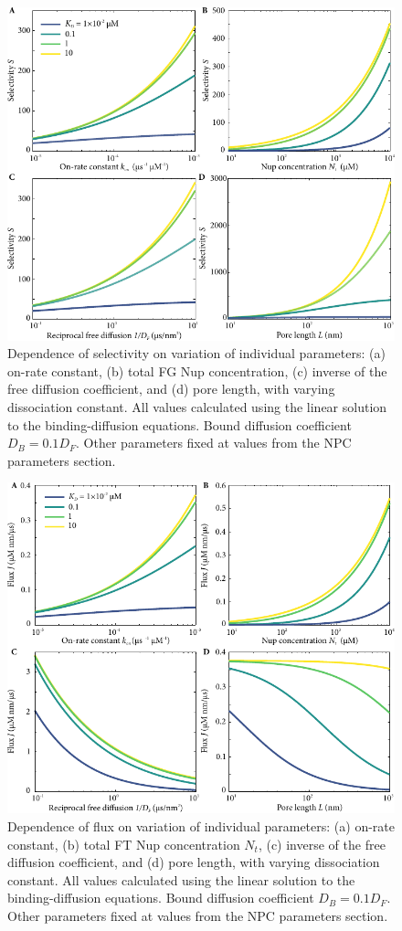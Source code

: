 \begin{figure}
\centering
\includegraphics[width=0.7\linewidth]{figs/ch02/parameter-variations.pdf}
\caption{Dependence of selectivity on variation of individual
  parameters: (a) on-rate constant, (b) total FG Nup concentration, (c) inverse of the free diffusion coefficient, and (d) pore
  length, with varying dissociation constant. All values calculated using the linear solution to the binding-diffusion equations.  Bound diffusion coefficient $D_B = 0.1D_F$. Other parameters fixed at values from the NPC parameters section.}
\label{fig:parameter-variations}
\end{figure}

\begin{figure}
\centering
\includegraphics[width=0.7\linewidth]{figs/ch02/parameter-variations-abs-flux.pdf}
\caption{Dependence of flux on variation of individual parameters: (a)
  on-rate constant, (b) total FT Nup concentration $N_t$, (c) inverse
  of the free diffusion coefficient, and (d) pore length, with varying
  dissociation constant. All values calculated using the linear solution to the binding-diffusion equations. Bound diffusion coefficient $D_B = 0.1D_F$. Other parameters fixed at values from the NPC parameters section.}
\label{fig:parameter-variations-abs-flux}
\end{figure}


